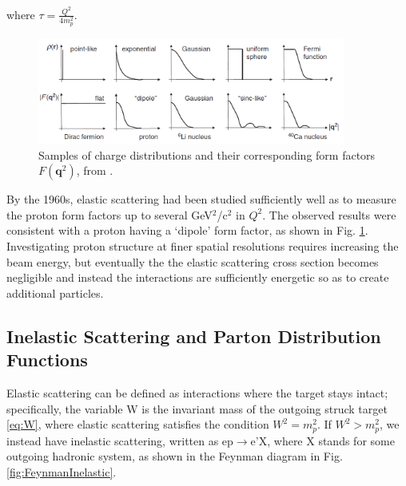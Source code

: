         where $\tau = \frac{Q^2}{4m_p^2}$.
        

        \begin{figure}[H]
            \centering
            \includegraphics[width=0.9\textwidth]{Chapters/Ch1-Intro/Ch1-Sec1-Background/pics/intro/possibleformfactors.png}
            \caption[Fourier Transforms of Charge Distributions]{Samples of charge distributions and their corresponding form factors $F(\textbf{q}^2)$, from \parencite{Thomson2013ModernPhysics}. }
            \label{fig:formfactors}
        \end{figure}
        

                By the 1960s, elastic scattering had been studied sufficiently well as to measure the proton form factors up to several GeV$^2$/c$^2$ in $Q^2$. The observed results were consistent with a proton having a `dipole' form factor, as shown in Fig. \ref{fig:formfactors}. Investigating proton structure at finer spatial resolutions requires increasing the beam energy, but eventually the the elastic scattering cross section becomes negligible and instead the interactions are sufficiently energetic so as to create additional particles.
                






    \subsection{Inelastic Scattering and Parton Distribution Functions}

        Elastic scattering can be defined as interactions where the target stays intact; specifically, the variable W is the invariant mass of the outgoing struck target \eqref{eq:W}, where elastic scattering satisfies the condition $W^2 =m_p^2$. If $W^2 > m_p^2$, we instead have inelastic scattering, written as ep$\rightarrow$e'X, where X stands for some outgoing hadronic system, as shown in the Feynman diagram in Fig. \ref{fig:FeynmanInelastic}.    

